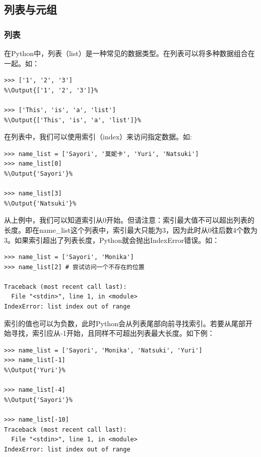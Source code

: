 \documentclass[../../Main.tex]{subfiles}
\begin{document}
\subsection{列表与元组}

\subsubsection{列表}

在Python中，列表（list）是一种常见的数据类型。在列表可以将多种数据组合在一起。如：
\begin{lstlisting}
>>> ['1', '2', '3']
%\Output{['1', '2', '3']}%

>>> ['This', 'is', 'a', 'list']
%\Output{['This', 'is', 'a', 'list']}%

\end{lstlisting}


在列表中，我们可以使用索引（index）来访问指定数据。如:
\begin{lstlisting}
>>> name_list = ['Sayori', '莫妮卡', 'Yuri', 'Natsuki']
>>> name_list[0]
%\Output{'Sayori'}%

>>> name_list[3]
%\Output{'Natsuki'}%
\end{lstlisting}

\begin{Warning}
    从上例中，我们可以知道索引从0开始。但请注意：索引最大值不可以超出列表的长度。即在name\_list这个列表中，索引最大只能为3，因为此时从0往后数4个数为3。如果索引超出了列表长度，Python就会抛出IndexError错误。如：
    \begin{lstlisting}[numbers=none]
>>> name_list = ['Sayori', 'Monika']
>>> name_list[2] # 尝试访问一个不存在的位置

Traceback (most recent call last):
  File "<stdin>", line 1, in <module>
IndexError: list index out of range
    \end{lstlisting}
\end{Warning}

\begin{ExtraKnowledge}
    索引的值也可以为负数，此时Python会从列表尾部向前寻找索引。若要从尾部开始寻找，索引应从-1开始，且同样不可超出列表最大长度。如下例：
    \begin{lstlisting}[numbers=none]
>>> name_list = ['Sayori', 'Monika', 'Natsuki', 'Yuri']
>>> name_list[-1]
%\Output{'Yuri'}%

>>> name_list[-4]
%\Output{'Sayori'}%

>>> name_list[-10]
Traceback (most recent call last):
  File "<stdin>", line 1, in <module>
IndexError: list index out of range
    \end{lstlisting}
\end{ExtraKnowledge}
\end{document}
